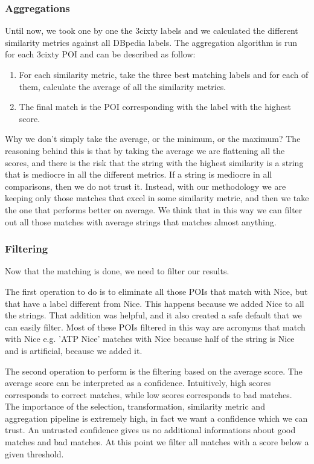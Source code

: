 \documentclass[paper=a4, fontsize=11pt]{scrartcl}
\begin{document}
\subsubsection{Aggregations}
Until now, we took one by one the 3cixty labels and we calculated the different similarity metrics against all DBpedia labels. 
The aggregation algorithm is run for each 3cixty POI and can be described as follow:
\begin{enumerate}
\item For each similarity metric, take the three best matching labels and for each of them, calculate the average of all the similarity metrics.
\item The final match is the POI corresponding with the label with the highest score.
\end{enumerate}
Why we don't simply take the average, or the minimum, or the maximum?
The reasoning behind this is that by taking the average we are flattening all the scores, and there is the risk that the string with the highest similarity is a string that is mediocre in all the different metrics. If a string is mediocre in all comparisons, then we do not trust it. Instead, with our methodology we are keeping only those matches that excel in some similarity metric, and then we take the one that performs better on average. We think that in this way we can filter out all those matches with average strings that matches almost anything.

\subsubsection{Filtering}
Now that the matching is done, we need to filter our results.

The first operation to do is to eliminate all those POIs that match with Nice, but that have a label different from Nice. This happens because we added Nice to all the strings. That addition was helpful, and it also created a safe default that we can easily filter.
Most of these POIs filtered in this way are acronyms that match with Nice e.g. 'ATP Nice' matches with Nice because half of the string is Nice and is artificial, because we added it.

The second operation to perform is the filtering based on the average score.
The average score can be interpreted as a confidence. Intuitively, high scores corresponds to correct matches, while low scores corresponds to bad matches.
The importance of the selection, transformation, similarity metric and aggregation pipeline is extremely high, in fact we want a confidence which we can trust. An untrusted confidence gives us no additional informations about good matches and bad matches.
At this point we filter all matches with a score below a given threshold.
\end{document}
